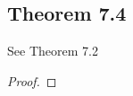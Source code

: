 \documentclass[../../main.tex]{subfiles}
\begin{document}
\subsection{Theorem 7.4}
\begin{wts}
    See Theorem 7.2
\end{wts}
\begin{proof}

\end{proof}
\end{document}
